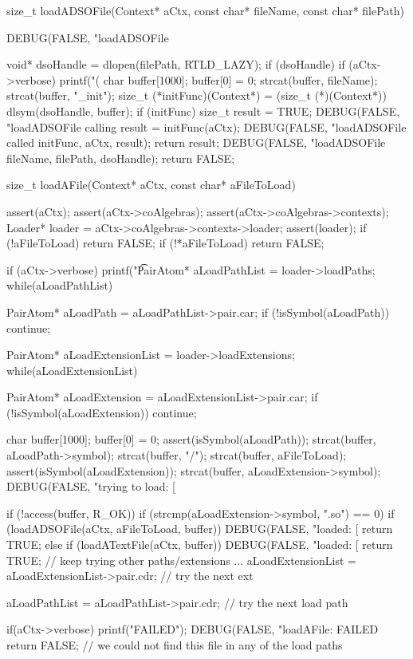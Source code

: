 size_t loadADSOFile(Context* aCtx, const char* fileName,
                    const char* filePath) {
  DEBUG(FALSE, "loadADSOFile {%
  void* dsoHandle = dlopen(filePath, RTLD_LAZY);
  if (dsoHandle) {
    if (aCtx->verbose) printf("(%
    char buffer[1000];
    buffer[0] = 0;
    strcat(buffer, fileName);
    strcat(buffer, "_init");
    size_t (*initFunc)(Context*) =
      (size_t (*)(Context*)) dlsym(dsoHandle, buffer);
    if (initFunc) {
      size_t result = TRUE;
      DEBUG(FALSE, "loadADSOFile calling %
      result = initFunc(aCtx);
      DEBUG(FALSE, "loadADSOFile called %
            initFunc, aCtx, result);
      return result;
    }
  }
  DEBUG(FALSE, "loadADSOFile {%
        fileName, filePath, dsoHandle);
  return FALSE;
}

size_t loadAFile(Context* aCtx, const char* aFileToLoad) {
  assert(aCtx);
  assert(aCtx->coAlgebras);
  assert(aCtx->coAlgebras->contexts);
  Loader* loader = aCtx->coAlgebras->contexts->loader;
  assert(loader);
  if (!aFileToLoad) return FALSE;
  if (!*aFileToLoad) return FALSE;

  if (aCtx->verbose) printf("\t%

  PairAtom* aLoadPathList = loader->loadPaths;
  while(aLoadPathList) {
    PairAtom* aLoadPath = aLoadPathList->pair.car;
    if (!isSymbol(aLoadPath)) continue;

    PairAtom* aLoadExtensionList = loader->loadExtensions;
    while(aLoadExtensionList) {
      PairAtom* aLoadExtension = aLoadExtensionList->pair.car;
      if (!isSymbol(aLoadExtension)) continue;

      char buffer[1000];
      buffer[0] = 0;
      assert(isSymbol(aLoadPath));
      strcat(buffer, aLoadPath->symbol);
      strcat(buffer, "/");
      strcat(buffer, aFileToLoad);
      assert(isSymbol(aLoadExtension));
      strcat(buffer, aLoadExtension->symbol);
      DEBUG(FALSE, "trying to load: [%

      if (!access(buffer, R_OK)) {
        if (strcmp(aLoadExtension->symbol, ".so") == 0) {
          if (loadADSOFile(aCtx, aFileToLoad, buffer)) {
            DEBUG(FALSE, "loaded: [%
            return TRUE;
          }
        } else if (loadATextFile(aCtx, buffer)) {
          DEBUG(FALSE, "loaded: [%
          return TRUE;
        }
        // keep trying other paths/extensions ...
      }
      aLoadExtensionList = aLoadExtensionList->pair.cdr; // try the next ext
    }
    aLoadPathList = aLoadPathList->pair.cdr; // try the next load path
  }
  if(aCtx->verbose) printf("FAILED\n");
  DEBUG(FALSE, "loadAFile: FAILED%
  return FALSE; // we could not find this file in any of the load paths
}

}}
